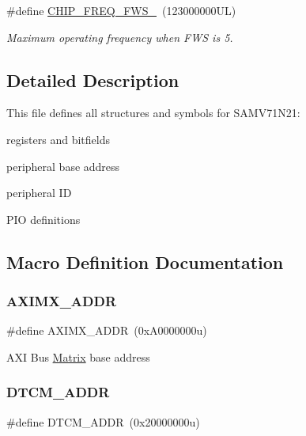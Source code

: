 \begin{DoxyCompactItemize}
\mbox{\label{group__SAMV71N21__definitions_ga3b66824f858591135877b369f98d48a5}} 
\#define \mbox{\hyperlink{group__SAMV71N21__definitions_ga3b66824f858591135877b369f98d48a5}{C\+H\+I\+P\+\_\+\+F\+R\+E\+Q\+\_\+\+F\+W\+S\+\_}}~(123000000\+U\+L)
\begin{DoxyCompactList}\small\item\em Maximum operating frequency when F\+WS is 5. \end{DoxyCompactList}\end{DoxyCompactItemize}


\subsection{Detailed Description}
This file defines all structures and symbols for S\+A\+M\+V71\+N21\+:
\begin{DoxyItemize}
\item registers and bitfields
\item peripheral base address
\item peripheral ID
\item P\+IO definitions 
\end{DoxyItemize}

\subsection{Macro Definition Documentation}
\mbox{\label{group__SAMV71N21__definitions_ga2fb7cc681bf5e7fbce5e3635b72a330a}} 
\subsubsection{\texorpdfstring{AXIMX\_ADDR}{AXIMX\_ADDR}}
{\footnotesize\ttfamily \#define A\+X\+I\+M\+X\+\_\+\+A\+D\+DR~(0x\+A0000000u)}

A\+XI Bus \mbox{\hyperlink{structMatrix}{Matrix}} base address \mbox{\label{group__SAMV71N21__definitions_ga26626a425f7ebb3a0c2dbc276f0d9f78}} 
\subsubsection{\texorpdfstring{DTCM\_ADDR}{DTCM\_ADDR}}
{\footnotesize\ttfamily \#define D\+T\+C\+M\+\_\+\+A\+D\+DR~(0x20000000u)}

